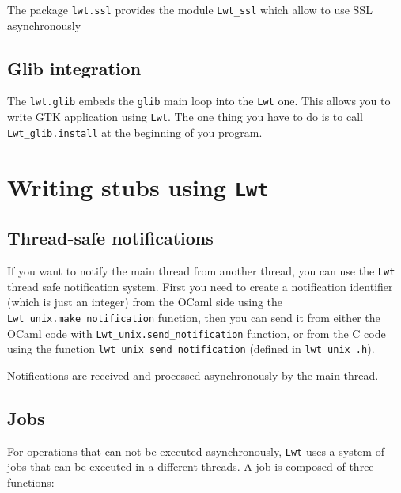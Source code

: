 The package {\tt lwt.ssl} provides the module {\tt Lwt\_ssl}
which allow to use SSL asynchronously



\subsection{ Glib integration }

The {\tt lwt.glib} embeds the {\tt glib} main loop into the
{\tt Lwt} one. This allows you to write GTK application using {\tt Lwt}.  The
one thing you have to do is to call {\tt Lwt\_glib.install} at
the beginning of you program.



\section{ Writing stubs using {\tt Lwt} }

\subsection{ Thread-safe notifications }

If you want to notify the main thread from another thread, you can use the {\tt Lwt}
thread safe notification system. First you need to create a notification identifier
(which is just an integer) from the OCaml side using the
{\tt Lwt\_unix.make\_notification} function, then you can send it from either the
OCaml code with {\tt Lwt\_unix.send\_notification} function, or from the C code using
the function {\tt lwt\_unix\_send\_notification} (defined in {\tt lwt\_unix\_.h}).



Notifications are received and processed asynchronously by the main thread.



\subsection{ Jobs }

For operations that can not be executed asynchronously, {\tt Lwt}
uses a system of jobs that can be executed in a different threads. A
job is composed of three functions:



